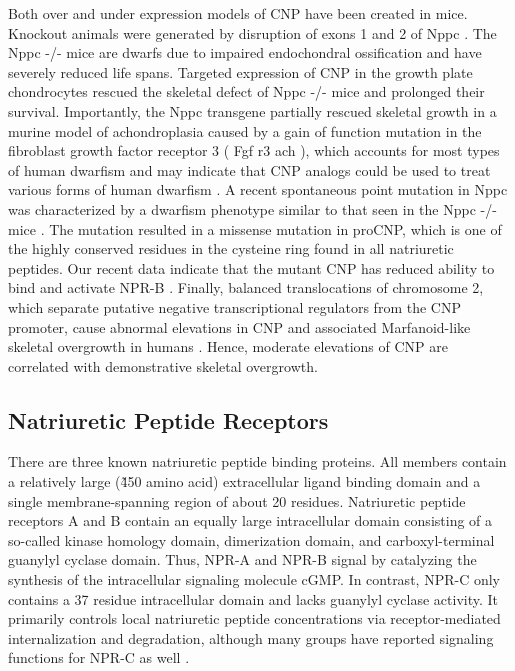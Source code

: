 \documentclass[14pt,a4paper,onecolumn]{extarticle}
\begin{document}
Both over and under expression models of CNP have been created in mice. Knockout animals were generated by disruption of exons 1 and 2 of Nppc \citep{Chusho2001}. The Nppc -/- mice are dwarfs due to impaired endochondral ossification and have severely reduced life spans. Targeted expression of CNP in the growth plate chondrocytes rescued the skeletal defect of Nppc -/- mice and prolonged their survival. Importantly, the Nppc transgene partially rescued skeletal growth in a murine model of achondroplasia caused by a gain of function mutation in the fibroblast growth factor receptor 3 ( Fgf r3 ach ), which accounts for most types of human dwarfism and may indicate that CNP analogs could be used to treat various forms of human dwarfism \citep{Yasoda2004}. A recent spontaneous point mutation in Nppc was characterized by a dwarfism phenotype similar to that seen in the Nppc -/- mice \citep{Jiao2007}. The mutation resulted in a missense mutation in proCNP, which is one of the highly conserved residues in the cysteine ring found in all natriuretic peptides.
Our recent data indicate that the mutant CNP has reduced ability to bind and activate NPR-B \citep{Yoder2008}. Finally, balanced translocations of chromosome 2, which separate putative negative transcriptional regulators from the CNP promoter, cause abnormal elevations in CNP and associated Marfanoid-like skeletal overgrowth in humans \citep{Bocciardi2007} \citep{Moncla2007}. Hence, moderate elevations of CNP are correlated with demonstrative skeletal overgrowth.

\subsection{Natriuretic Peptide Receptors}
There are three known natriuretic peptide binding proteins. All members contain a relatively large (\~450 amino acid) extracellular ligand binding domain and a single membrane-spanning region of about 20 residues. Natriuretic peptide receptors A and B contain an equally large intracellular domain consisting of a so-called kinase homology domain, dimerization domain, and carboxyl-terminal guanylyl cyclase domain. Thus, NPR-A and NPR-B signal by catalyzing the synthesis of the intracellular signaling molecule cGMP. In contrast, NPR-C only contains a 37 residue intracellular domain and lacks guanylyl cyclase activity. It primarily controls local natriuretic peptide concentrations via receptor-mediated internalization and degradation, although many groups have reported signaling functions for NPR-C as well \citep{Rose2008}.
\end{document}
